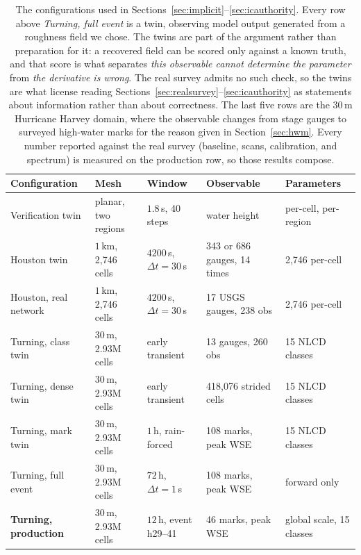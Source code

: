 \documentclass[11pt]{article}
\begin{document}
\begin{table}
\centering\footnotesize
\begin{tabular}{@{}lllll@{}}
\toprule
Configuration & Mesh & Window & Observable & Parameters \\
\midrule
Verification twin
  & planar, two regions
  & $1.8$\,s, 40 steps
  & water height
  & per-cell, per-region \\
Houston twin
  & $1$\,km, 2{,}746 cells
  & $4200$\,s, $\Delta t = 30$\,s
  & 343 or 686 gauges, 14 times
  & 2{,}746 per-cell \\
Houston, real network
  & $1$\,km, 2{,}746 cells
  & $4200$\,s, $\Delta t = 30$\,s
  & 17 USGS gauges, 238 obs
  & 2{,}746 per-cell \\
Turning, class twin
  & $30$\,m, 2.93M cells
  & early transient
  & 13 gauges, 260 obs
  & 15 NLCD classes \\
Turning, dense twin
  & $30$\,m, 2.93M cells
  & early transient
  & 418{,}076 strided cells
  & 15 NLCD classes \\
Turning, mark twin
  & $30$\,m, 2.93M cells
  & $1$\,h, rain-forced
  & 108 marks, peak WSE
  & 15 NLCD classes \\
Turning, full event
  & $30$\,m, 2.93M cells
  & $72$\,h, $\Delta t = 1$\,s
  & 108 marks, peak WSE
  & forward only \\
\textbf{Turning, production}
  & $30$\,m, 2.93M cells
  & $12$\,h, event h29--41
  & 46 marks, peak WSE
  & global scale, 15 classes \\
\bottomrule
\end{tabular}
\caption{The configurations used in Sections~\ref{sec:implicit}--\ref{sec:icauthority}.
Every row above \emph{Turning, full event} is a twin, observing model
output generated from a roughness field we chose. The twins are part of
the argument rather than preparation for it: a recovered field can be scored
only against a known truth, and that score is what separates
\emph{this observable cannot determine the parameter} from \emph{the
derivative is wrong}. The real survey admits no such check, so the
twins are what license reading
Sections~\ref{sec:realsurvey}--\ref{sec:icauthority} as statements
about information rather than about correctness. The last five rows are
the 30\,m Hurricane Harvey domain, where the observable changes from
stage gauges to surveyed high-water marks for the reason given in
Section~\ref{sec:hwm}. Every number reported against the real survey
(baseline, scans, calibration, and spectrum) is measured on the
production row, so those results compose.}
\label{tab:configs}
\end{table}
\end{document}
